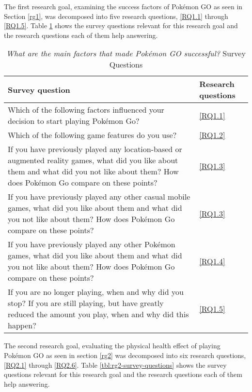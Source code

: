 
The first research goal, examining the success factors of Pokémon GO as seen in Section \ref{rg1}, was decomposed into five research questions, \ref{RQ1.1} through \ref{RQ1.5}. Table \ref{tbl:rg1-survey-questions} shows the survey questions relevant for this research goal and the research questions each of them help answering.

\begin{table}[h]
	\caption{\emph{What are the main factors that made Pokémon GO successful?} Survey Questions}
	\centering
	\label{tbl:rg1-survey-questions}
	\begin{tabularx}{\textwidth}{|X|l|}
		\hline
		\textbf{Survey question} & \textbf{Research questions}\\
		\hline\hline
		
		Which of the following factors influenced your decision to start playing Pokémon Go? & \ref{RQ1.1}\\
		\hline
		
		Which of the following game features do you use? & \ref{RQ1.2}\\
		\hline
		
		If you have previously played any location-based or augmented reality games, what did you like about them and what did you not like about them? How does Pokémon Go compare on these points? & \ref{RQ1.3}\\
		\hline
		
		If you have previously played any other casual mobile games, what did you like about them and what did you not like about them? How does Pokémon Go compare on these points? & \ref{RQ1.3}\\
		\hline
		
		If you have previously played any other Pokémon games, what did you like about them and what did you not like about them? How does Pokémon Go compare on these points? & \ref{RQ1.4}\\
		\hline
		
		If you are no longer playing, when and why did you stop? If you are still playing, but have greatly reduced the amount you play, when and why did this happen? & \ref{RQ1.5}\\
		\hline
	\end{tabularx}
\end{table}

The second research goal, evaluating the physical health effect of playing Pokémon GO as seen in section \ref{rg2} was decomposed into six research questions, \ref{RQ2.1} through \ref{RQ2.6}. Table \ref{tbl:rg2-survey-questions} shows the survey questions relevant for this research goal and the research questions each of them help answering.

